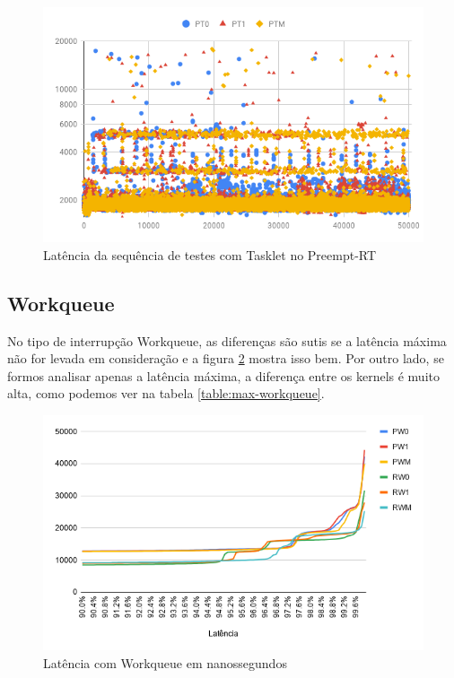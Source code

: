 \begin{figure}[!htb]
    \centering
    \includegraphics[width=\textwidth]{graficos/pt-scatter.png}
    \caption{Latência da sequência de testes com Tasklet no Preempt-RT}
    \label{grafico:p-tasklet}
\end{figure}

\subsection{Workqueue}

No tipo de interrupção Workqueue, as diferenças são sutis se a latência máxima não for levada em consideração e a figura \ref{grafico:workqueue} mostra isso bem. Por outro lado, se formos analisar apenas a latência máxima, a diferença entre os kernels é muito alta, como podemos ver na tabela \ref{table:max-workqueue}.

\begin{figure}[!htb]
    \centering
    \includegraphics[width=\textwidth]{graficos/workqueue.png}
    \caption{Latência com Workqueue em nanossegundos}
    \label{grafico:workqueue}
\end{figure}

